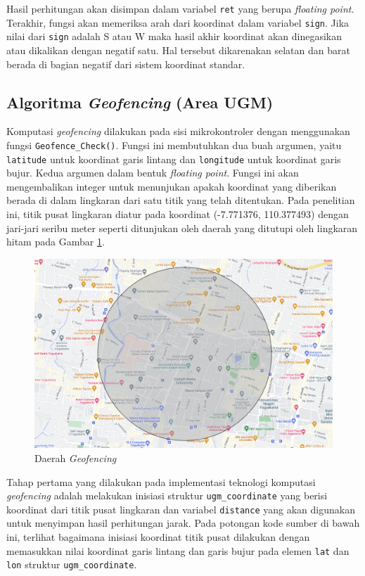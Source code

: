 Hasil perhitungan akan disimpan dalam variabel \texttt{ret} yang berupa \textit{floating point}. Terakhir, fungsi akan memeriksa arah dari koordinat dalam variabel \texttt{sign}. Jika nilai dari \texttt{sign} adalah S atau W maka hasil akhir koordinat akan dinegasikan atau dikalikan dengan negatif satu. Hal tersebut dikarenakan selatan dan barat berada di bagian negatif dari sistem koordinat standar.

\subsection{Algoritma \textit{Geofencing} (Area UGM)}
Komputasi \textit{geofencing} dilakukan pada sisi mikrokontroler dengan menggunakan fungsi \texttt{Geofence\_Check()}. Fungsi ini membutuhkan dua buah argumen, yaitu \texttt{latitude} untuk koordinat garis lintang dan \texttt{longitude} untuk koordinat garis bujur. Kedua argumen dalam bentuk \textit{floating point}. Fungsi ini akan mengembalikan integer untuk menunjukan apakah koordinat yang diberikan berada di dalam lingkaran dari satu titik yang telah ditentukan. Pada penelitian ini, titik pusat lingkaran diatur pada koordinat (-7.771376, 110.377493) dengan jari-jari seribu meter seperti ditunjukan oleh daerah yang ditutupi oleh lingkaran hitam pada Gambar \ref{Fig: geofence-map}.

\begin{figure}[H]
	\centering
	\includegraphics[width=12cm]{contents/chapter-3/geofence-map.png}
	\caption{Daerah \textit{Geofencing}}
	\label{Fig: geofence-map}
\end{figure} 

Tahap pertama yang dilakukan pada implementasi teknologi komputasi \textit{geofencing} adalah melakukan inisiasi struktur \texttt{ugm\_coordinate} yang berisi koordinat dari titik pusat lingkaran dan variabel \texttt{distance} yang akan digunakan untuk menyimpan hasil perhitungan jarak. Pada potongan kode sumber di bawah ini, terlihat bagaimana inisiasi koordinat titik pusat dilakukan dengan memasukkan nilai koordinat garis lintang dan garis bujur pada elemen \texttt{lat} dan \texttt{lon} struktur \texttt{ugm\_coordinate}.

